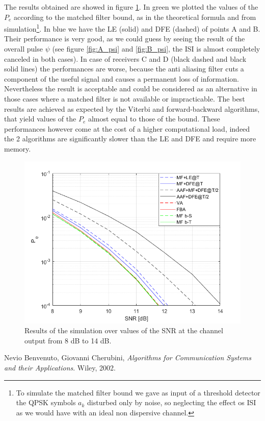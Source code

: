 \documentclass[a4paper,11.5pt]{article}
\begin{document}
The results obtained are showed in figure \ref{fig:SNR}. In green we plotted the values of the $P_e$ according to the matched filter bound, as in the theoretical formula and from simulation\footnote{To simulate the matched filter bound we gave as input of a threshold detector the QPSK symbols $a_k$ disturbed only by noise, so neglecting the effect os ISI as we would have with an ideal non dispersive channel.}. In blue we have the LE (solid) and DFE (dashed) of points A and B. Their performance is very good, as we could guess by seeing the result of the overall pulse $\psi$ (see figure \ref{fig:A_psi} and \ref{fig:B_psi}, the ISI is almost completely canceled in both cases).
In case of receivers C and D (black dashed and black solid lines) the performances are worse, because the anti aliasing filter cuts a component of the useful signal and causes a permanent loss of information. Nevertheless the result is acceptable and could be considered as an alternative in those cases where a matched filter is not available or impracticable. The best results are achieved as expected by the Viterbi and forward-backward algorithms, that yield values of the $P_e$ almost equal to those of the bound. These performances however come at the cost of a higher computational load, indeed the 2 algorithms are significantly slower than the LE and DFE and require more memory.


\begin{figure}[H]
	\begin{center}   
		\includegraphics[width=\textwidth]{figs/SNR_Pe.png} 
		\caption{Results of the simulation over values of the SNR at the channel output from 8 dB to 14 dB.}
		\label{fig:SNR}
	\end{center}
\end{figure}


 
\begin{thebibliography}{15}
	
	Nevio Benvenuto, Giovanni Cherubini,
	\textit{Algorithms for Communication Systems and their Applications}. 
	Wiley, 2002.
	

	
\end{thebibliography}
\end{document}
